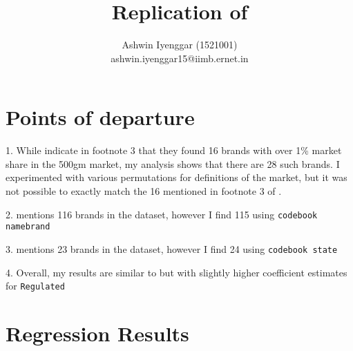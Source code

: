 \documentclass[12pt]{article}
\begin{document}
\title{Replication of \cite{Bhaskarabhatla2016}}
\author{Ashwin Iyenggar  (1521001) \\ ashwin.iyenggar15@iimb.ernet.in} 


\maketitle
\thispagestyle{empty}

\section{Points of departure}
1. While \cite{Bhaskarabhatla2016} indicate in footnote 3 that they found 16 brands with over 1\% market share in the 500gm market, my analysis shows that there are 28 such brands. I experimented with various permutations for definitions of the market, but it was not possible to exactly match the 16 mentioned in footnote 3 of \cite{Bhaskarabhatla2016}. 

2. \cite{Bhaskarabhatla2016} mentions 116 brands in the dataset, however I find 115 using \verb|codebook namebrand|

3. \cite{Bhaskarabhatla2016} mentions 23 brands in the dataset, however I find 24 using \verb|codebook state|

4. Overall, my results are similar to \cite{Bhaskarabhatla2016} but with  slightly higher coefficient estimates for \verb|Regulated|

\section{Regression Results}
\end{document}
